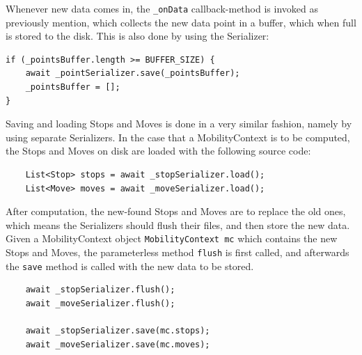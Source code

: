 Whenever new data comes in, the \verb|_onData| callback-method is invoked as previously mention, which collects the new data point in a buffer, which when full is stored to the disk. This is also done by using the Serializer:

\begin{verbatim}
if (_pointsBuffer.length >= BUFFER_SIZE) {
    await _pointSerializer.save(_pointsBuffer);
    _pointsBuffer = [];
}
\end{verbatim}


Saving and loading Stops and Moves is done in a very similar fashion, namely by using separate Serializers. In the case that a MobilityContext is to be computed, the Stops and Moves on disk are loaded with the following source code:

\begin{verbatim}
    List<Stop> stops = await _stopSerializer.load();
    List<Move> moves = await _moveSerializer.load();
\end{verbatim}

After computation, the new-found Stops and Moves are to replace the old ones, which means the Serializers should flush their files, and then store the new data. Given a MobilityContext object \verb|MobilityContext mc| which contains the new Stops and Moves, the parameterless method \verb|flush| is first called, and afterwards the \verb|save| method is called with the new data to be stored.
\begin{verbatim}
    await _stopSerializer.flush();
    await _moveSerializer.flush();

    await _stopSerializer.save(mc.stops);
    await _moveSerializer.save(mc.moves);
\end{verbatim}

